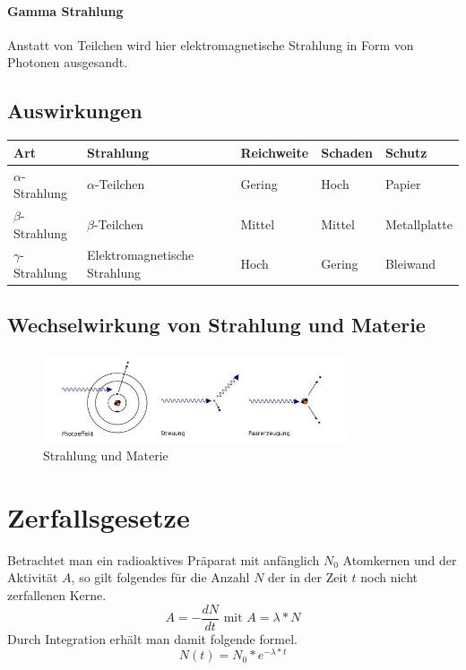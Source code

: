 \documentclass{school}
\begin{document}
\paragraph{Gamma Strahlung}
Anstatt von Teilchen wird hier elektromagnetische Strahlung in Form von Photonen ausgesandt.

\subsection{Auswirkungen}
\begin{tabular}{l|l|l|l|l}
    Art & Strahlung & Reichweite & Schaden & Schutz\\
    \hline
    $\alpha$-Strahlung & $\alpha$-Teilchen & Gering & Hoch & Papier\\
    $\beta$-Strahlung & $\beta$-Teilchen & Mittel & Mittel & Metallplatte \\
    $\gamma$-Strahlung & Elektromagnetische Strahlung & Hoch & Gering & Bleiwand
\end{tabular}

\subsection{Wechselwirkung von Strahlung und Materie}
\begin{figure}[!ht]
\centering
    \includegraphics[width=0.8\textwidth]{strahlung-materie.jpg}
    \caption[http://www.sebastian-hess.eu]{Strahlung und Materie}
\end{figure}

\section{Zerfallsgesetze}
Betrachtet man ein radioaktives Präparat mit anfänglich $N_{0}$ Atomkernen und der Aktivität $A$, so gilt folgendes für die Anzahl $N$ der in der Zeit $t$ noch nicht zerfallenen Kerne.
$$A = -\frac{dN}{dt} \text{ mit } A = \lambda * N$$
Durch Integration erhält man damit folgende formel.
$$N(t) = N_0 * e^{-\lambda * t}$$
\end{document}
